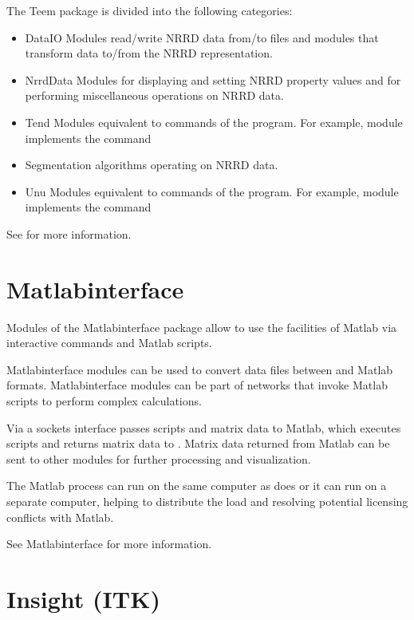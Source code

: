 The Teem package is divided into the following categories:

\begin{itemize}
\item DataIO Modules read/write NRRD data from/to files and
  modules that transform data to/from the NRRD representation.
\item NrrdData Modules for displaying and setting NRRD property values
  and for performing miscellaneous operations on NRRD data.
\item Tend Modules equivalent to commands of the 
  program.  For example, module  implements the
  command 
\item Segmentation  algorithms operating on NRRD data.
\item Unu Modules equivalent to commands of the  program.
  For example, module  implements the command
\end{itemize}

See  for more
information.

\section{Matlabinterface}
\label{sec:matlabpackage}

Modules of the Matlabinterface package allow \sr{} to use the
facilities of Matlab via interactive commands and Matlab scripts.

Matlabinterface modules can be used to convert
data files between \sr{} and Matlab formats.  Matlabinterface
modules can be part of \sr{} networks that invoke Matlab scripts to
perform complex calculations.

Via a sockets interface \sr{} passes scripts and matrix data to
Matlab, which executes  scripts and returns matrix data to \sr{}.
Matrix data returned from Matlab can be sent to other modules for
further processing and visualization.

The Matlab process can run on the same computer as does \sr{} or it
can run on a separate computer, helping to distribute the load and
resolving potential licensing conflicts with Matlab.

See Matlabinterface  for more
information.

\section{Insight (ITK)}
\label{sec:insightpackage}


